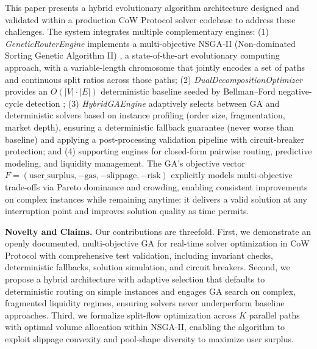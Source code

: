 \documentclass[11pt]{article}
\newcommand{\1}{\mathbf{1}}  %
\begin{document}
This paper presents a hybrid evolutionary algorithm architecture designed and validated within a production CoW Protocol solver codebase to address these challenges. The system integrates multiple complementary engines: (1) \emph{GeneticRouterEngine} implements a multi-objective NSGA-II (Non-dominated Sorting Genetic Algorithm II) \cite{deb2002nsga2}, a state-of-the-art evolutionary computing approach, with a variable-length chromosome that jointly encodes a set of paths and continuous split ratios across those paths; (2) \emph{DualDecompositionOptimizer} provides an $O(|V|\cdot|E|)$ deterministic baseline seeded by Bellman--Ford negative-cycle detection \cite{bellman1958routing,ford1956flows}; (3) \emph{HybridGAEngine} adaptively selects between GA and deterministic solvers based on instance profiling (order size, fragmentation, market depth), ensuring a deterministic fallback guarantee (never worse than baseline) and applying a post-processing validation pipeline with circuit-breaker protection; and (4) supporting engines for closed-form pairwise routing, predictive modeling, and liquidity management. The GA's objective vector $F=(\text{user\_surplus},-\text{gas},-\text{slippage},-\text{risk})$ explicitly models multi-objective trade-offs via Pareto dominance and crowding, enabling consistent improvements on complex instances while remaining anytime: it delivers a valid solution at any interruption point and improves solution quality as time permits.

\textbf{Novelty and Claims.} Our contributions are threefold. First, we demonstrate an openly documented, multi-objective GA for real-time solver optimization in CoW Protocol with comprehensive test validation, including invariant checks, deterministic fallbacks, solution simulation, and circuit breakers. Second, we propose a hybrid architecture with adaptive selection that defaults to deterministic routing on simple instances and engages GA search on complex, fragmented liquidity regimes, ensuring solvers never underperform baseline approaches. Third, we formalize split-flow optimization across $K$ parallel paths with optimal volume allocation within NSGA-II, enabling the algorithm to exploit slippage convexity and pool-shape diversity to maximize user surplus.
\end{document}

